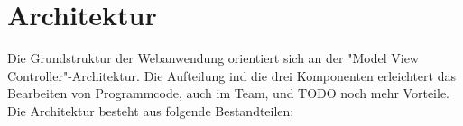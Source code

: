 \section{Architektur}

Die Grundstruktur der Webanwendung orientiert sich an der "Model View Controller"-Architektur. Die Aufteilung ind die drei Komponenten
erleichtert das Bearbeiten von Programmcode, auch im Team, und TODO noch mehr Vorteile.
\\
Die Architektur besteht aus folgende Bestandteilen:



